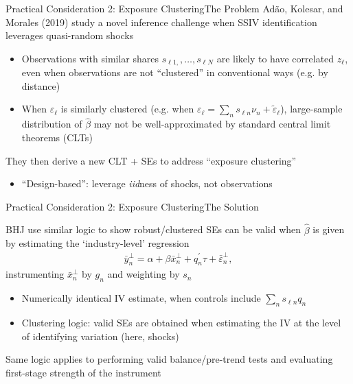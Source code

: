 \documentclass[t]{beamer}
\begin{document}
\begin{frame}{Practical Consideration 2: Exposure Clustering}{The Problem}
\vspace{-0.3cm}
Ad\~{a}o, Kolesar, and Morales (2019) study a novel inference challenge when SSIV identification leverages quasi-random shocks \smallskip

\begin{itemize}
\item Observations with similar shares $s_{\ell 1,},\dots,s_{\ell N}$ are likely to have correlated $z_\ell$, even when observations are not ``clustered'' in conventional ways (e.g. by distance)\smallskip\pause{}

\item When $\varepsilon_\ell$ is similarly clustered (e.g. when $\varepsilon_\ell=\sum_n s_{\ell n}\nu_n +\tilde{\varepsilon}_\ell$), large-sample distribution of $\hat{\beta}$ may not be well-approximated by standard central limit theorems (CLTs)
\end{itemize}
\medskip\pause{}
They then derive a new CLT + SEs to address ``exposure clustering''\medskip
\begin{itemize}
\item ``Design-based'': leverage \emph{iid}ness of shocks, not observations
\end{itemize}
\end{frame}

\begin{frame}{Practical Consideration 2: Exposure Clustering}{The Solution}

BHJ use similar logic to show robust/clustered SEs can be valid when $\hat{\beta}$ is given by estimating the `industry-level' regression
\begin{align*}
\bar{y}_n^\perp = \alpha+\beta\bar{x}_n^\perp+q_n^\prime\tau+\bar{\varepsilon}_n^\perp,
\end{align*}
instrumenting $\bar{x}_n^\perp$ by $g_n$ and weighting by $s_n$
\smallskip\pause
\begin{itemize}
\item Numerically identical IV estimate, when controls include $\sum_n s_{\ell n} q_n$\smallskip
\item Clustering logic: valid SEs are obtained when estimating the IV at the level of identifying variation (here, shocks)
\end{itemize}\pause
Same logic applies to performing valid balance/pre-trend tests and evaluating first-stage strength of the instrument\smallskip
\end{frame}
\end{document}
